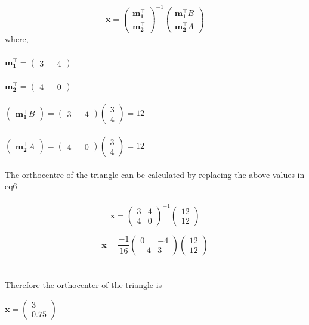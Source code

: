 \documentclass[journal,12pt,twocolumn]{IEEEtran}
\newcommand{\myvec}[1]{\ensuremath{\begin{pmatrix}#1\end{pmatrix}}}
\let\vec\mathbf
\begin{document}
\begin{equation}
\vec{x} = {\myvec{\vec{m_1^{\top}} \\ \vec{m_2^{\top}}}}^{-1}{\myvec{\vec{ m_1^{\top}}B \\ \vec{m_2^{\top}}A}}
\end{equation}                         \label{eq-6}
where,
\\
\\

$\vec{ m_1^{\top}} = \myvec{3&&4} $
\\
\\

$\vec{ m_2^{\top}} = \myvec{4&&0} $
\\
\\

$\myvec{\vec{ m_1^{\top}}B} = \myvec{3&&4}\myvec{3\\4} = 12$ 
\\
\\

$\myvec{\vec{ m_2^{\top}}A} = \myvec{4&&0}\myvec{3\\4} = 12$
\\  
 \\  
 
The orthocentre of the triangle can be calculated by replacing the above values in eq6
\\
\\ 
\begin{equation}
\vec{x} = {\myvec{3&4\\4&0}}^{-1}{\myvec{12\\12}}
\end{equation}




\begin{equation}
\vec{x} = \frac{-1}{16}{\myvec{0&-4\\-4&3}}{\myvec{12\\12}}
\end{equation}
  \\
  \\
Therefore the orthocenter of the triangle is
\\
\begin{center}
$\vec{x} = \myvec{3\\0.75}$
\end{center}
\end{document}
